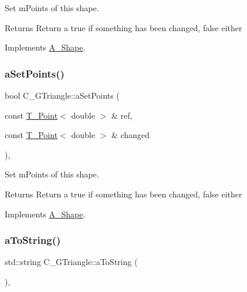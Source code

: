 Set m\+Points of this shape. 

\begin{DoxyReturn}{Returns}
Return a true if something has been changed, false either 
\end{DoxyReturn}


Implements \hyperlink{classA__Shape_a6996f454b337f8425ad13cba3f7a7c35}{A\+\_\+\+Shape}.

\mbox{\label{classC__GTriangle_a18c134ddf90bc4f5729064a47094068b}} 
\subsubsection{\texorpdfstring{a\+Set\+Points()}{aSetPoints()}\hspace{0.1cm}{\footnotesize\ttfamily [2/2]}}
{\footnotesize\ttfamily bool C\+\_\+\+G\+Triangle\+::a\+Set\+Points (\begin{DoxyParamCaption}\item[{const \hyperlink{classT__Point}{T\+\_\+\+Point}$<$ double $>$ \&}]{ref,  }\item[{const \hyperlink{classT__Point}{T\+\_\+\+Point}$<$ double $>$ \&}]{changed }\end{DoxyParamCaption})\hspace{0.3cm}{\ttfamily [override]}, {\ttfamily [virtual]}}



Set m\+Points of this shape. 

\begin{DoxyReturn}{Returns}
Return a true if something has been changed, false either 
\end{DoxyReturn}


Implements \hyperlink{classA__Shape_a6996f454b337f8425ad13cba3f7a7c35}{A\+\_\+\+Shape}.

\mbox{\label{classC__GTriangle_aa432e8b8320db8a53ef1d59b486ed7ce}} 
\subsubsection{\texorpdfstring{a\+To\+String()}{aToString()}\hspace{0.1cm}{\footnotesize\ttfamily [1/2]}}
{\footnotesize\ttfamily std\+::string C\+\_\+\+G\+Triangle\+::a\+To\+String (\begin{DoxyParamCaption}{ }\end{DoxyParamCaption})\hspace{0.3cm}{\ttfamily [override]}, {\ttfamily [virtual]}}



